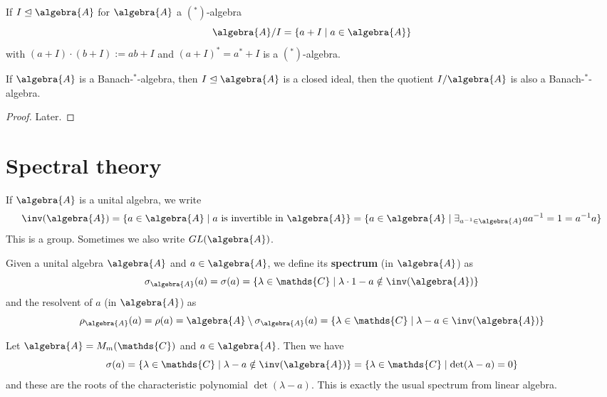 \documentclass[a4paper]{article}
\begin{document}
\begin{example}
	If $I \trianglelefteq \algebra{A}$ for $\algebra{A}$ a $(^*)$-algebra
	\begin{equation*}
		\algebra{A} / I = \{a + I \mid a \in \algebra{A}\}
	\end{equation*}
	with $(a + I) \cdot (b + I) := ab + I$ and $(a + I)^* = a^* + I$ is a $(^*)$-algebra.
\end{example}

\begin{theorem}
	If $\algebra{A}$ is a Banach-$^*$-algebra, then $I \trianglelefteq \algebra{A}$ is a closed ideal, then the quotient $I / \algebra{A}$ is also a Banach-$^*$-algebra.
\end{theorem}

\begin{proof}
	Later.
\end{proof}

\section{Spectral theory}

\begin{notation}
	If $\algebra{A}$ is
	a unital algebra, we write
	\begin{equation*}
		\inv(\algebra{A}) = \{a \in \algebra{A} \mid a \text{ is invertible in } \algebra{A}\} = \{a \in \algebra{A} \mid \exists_{a^{-1} \in \algebra{A}} a a^{-1} = 1 = a^{-1} a \}
	\end{equation*}
	This is a group. Sometimes we also write $GL(\algebra{A})$.
\end{notation}

\begin{definition}
	Given a unital algebra $\algebra{A}$ and $a \in \algebra{A}$, we define its \textbf{spectrum} (in $\algebra{A}$) as
	\begin{equation*}
		\sigma_\algebra{A}(a) = \sigma(a) = \{\lambda \in \mathds{C} \mid \lambda \cdot 1 - a \notin \inv(\algebra{A})\}
	\end{equation*}
	and the resolvent of $a$ (in $\algebra{A}$) as
	\begin{equation*}
		\rho_\algebra{A}(a) = \rho(a) = \algebra{A} \setminus \sigma_\algebra{A}(a) = \{\lambda \in \mathds{C} \mid \lambda - a \in \inv(\algebra{A})\}
	\end{equation*}
\end{definition}

\begin{example}
	Let $\algebra{A} = M_m(\mathds{C})$ and $a \in \algebra{A}$. Then we have
	\begin{equation*}
		\sigma(a) = \{\lambda \in \mathds{C} \mid \lambda - a \notin \inv(\algebra{A})\} = \{\lambda \in \mathds{C} \mid \det(\lambda - a) = 0\}
	\end{equation*}
	and these are the roots of the characteristic polynomial $\det(\lambda - a)$. This is exactly the usual spectrum from linear algebra.
\end{example}
\end{document}
